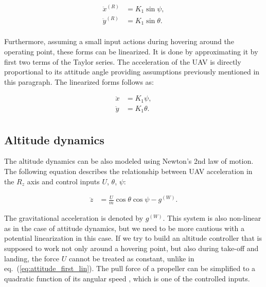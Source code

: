 \begin{equation}
\begin{split}
\ddot{x}^{(R)} &= K_1\sin \psi,\\
\ddot{y}^{(R)} &= K_1\sin \theta.\\
\end{split}
\label{eq:attitude_first_lin}
\end{equation}

Furthermore, assuming a small input actions during hovering around the operating point, these forms can be linearized. It is done by approximating it by first two terms of the Taylor series. The acceleration of the UAV is directly proportional to its attitude angle providing assumptions previously mentioned in this paragraph. The linearized forms follows as:

\begin{equation}
\begin{split}
\ddot{x} &= K_1 \psi,\\
\ddot{y} &= K_1 \theta.\\
\end{split}
\end{equation}

\subsection{Altitude dynamics}

The altitude dynamics can be also modeled using Newton's 2nd law of motion. The following equation describes the relationship between UAV acceleration in the $R_z$ axis and control inputs $U$, $\theta$, $\psi$:

\begin{equation}
\begin{split}
\ddot{z} &= \frac{U}{m}\cos\theta\cos\psi - g^{(W)}.
\end{split}
\end{equation}

The gravitational acceleration is denoted by $g^{(W)}$. This system is also non-linear as in the case of attitude dynamics, but we need to be more cautious with a potential linearization in this case. If we try to build an altitude controller that is supposed to work not only around a hovering point, but also during take-off and landing, the force $U$ cannot be treated as constant, unlike in eq.~(\ref{eq:attitude_first_lin}). The pull force of a propeller can be simplified to a quadratic function of its angular speed \citep{luukkonen2011modelling}, which is one of the controlled inputs.


